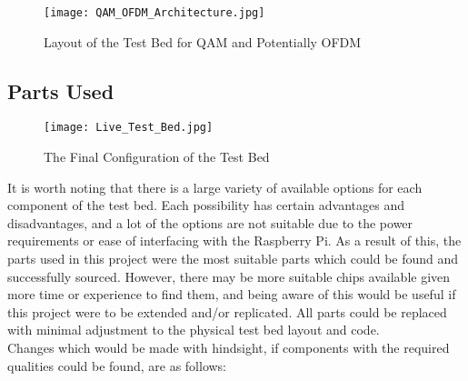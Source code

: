 \documentclass[../main.tex]{subfiles}
\begin{document}
\begin{figure}[ht]
	\centering
	\texttt{[image: QAM\_OFDM\_Architecture.jpg]}
	\caption{Layout of the Test Bed for QAM and Potentially OFDM}
\end{figure}

\subsection{Parts Used}

\begin{figure}[ht]
	\centering
	\texttt{[image: Live\_Test\_Bed.jpg]}
	\caption{The Final Configuration of the Test Bed}
\end{figure}


It is worth noting that there is a large variety of available options for each component of the test bed.
Each possibility has certain advantages and disadvantages, and a lot of the options are not suitable due to the power requirements or ease of interfacing with the Raspberry Pi.
As a result of this, the parts used in this project were the most suitable parts which could be found and successfully sourced.
However, there may be more suitable chips available given more time or experience to find them, and being aware of this would be useful if this project were to be extended and/or replicated.
All parts could be replaced with minimal adjustment to the physical test bed layout and code.\\

Changes which would be made with hindsight, if components with the required qualities could be found, are as follows:
\end{document}
